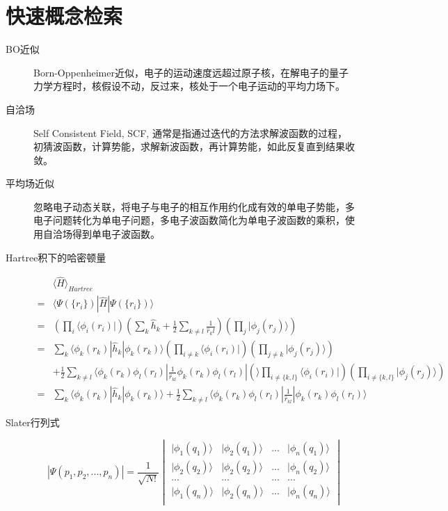 \documentclass[12pt,a4paper,openany,twoside]{book}
\numberwithin{equation}{section}
\newcommand{\bra}[1]{\langle #1 |}
\newcommand{\ket}[1]{| #1 \rangle}
\newcommand{\bracketl}[3]{\langle #1 | #2 | #3 \rangle}
\newcommand{\mean}[1]{\langle #1 \rangle}
\begin{document}
    \section{快速概念检索}
    \begin{description}
      \item[BO近似] Born-Oppenheimer近似，电子的运动速度远超过原子核，在解电子的量子力学方程时，核假设不动，反过来，核处于一个电子运动的平均力场下。
       
      \item[自洽场] Self Consistent Field, SCF, 通常是指通过迭代的方法求解波函数的过程，初猜波函数，计算势能，求解新波函数，再计算势能，如此反复直到结果收敛。
      
      \item[平均场近似] 忽略电子动态关联，将电子与电子的相互作用约化成有效的单电子势能，多电子问题转化为单电子问题，多电子波函数简化为单电子波函数的乘积，使用自洽场得到单电子波函数。
       
      \item[Hartree积下的哈密顿量] 
      \begin{align*}
        &\mean{\hat{H}}_{Hartree} \\
        =& \bracketl{\Psi(\{r_i\})}{\hat{H}}{\Psi(\{r_i\})}\\
        =&(\prod_i\bra{\phi_i(r_i)})(\sum_k\hat{h}_k+\frac{1}{2}\sum_{k\neq l}\frac{1}{\hat{r}_kl})(\prod_j\ket{\phi_j(r_j)})\\
        =&\sum_k\bracketl{\phi_k(r_k)}{\hat{h}_k}{\phi_k(r_k)}(\prod_{i\neq k}\bra{\phi_i(r_i)})(\prod_{j \neq k}\ket{\phi_j(r_j)})\\
        &+\frac{1}{2}\sum_{k \neq l}\bracketl{\phi_k(r_k)\phi_l(r_l)}{\frac{1}{\hat{r}_{kl}}\phi_k(r_k)\phi_l(r_l)}(\prod_{i \neq \{k,l\}}\bra{\phi_i(r_i)})(\prod_{i \neq \{k,l\}}\ket{\phi_j(r_j)})\\
        =&\sum_k\bracketl{\phi_k(r_k)}{\hat{h}_k}{\phi_k(r_k)}+\frac{1}{2}\sum_{k \neq l}\bracketl{\phi_k(r_k)\phi_l(r_l)}{\frac{1}{\hat{r}_{kl}}}{\phi_k(r_k)\phi_l(r_l)}
      \end{align*} 

      \item[Slater行列式]
      \begin{equation}
        |\Psi(p_1,p_2,...,p_n)|=\frac{1}{\sqrt{N!}}
        \begin{vmatrix}
        \ket{\phi_1(q_1)} & \ket{\phi_2(q_1)} & ... & \ket{\phi_n(q_1)}\\
        \ket{\phi_2(q_2)} & \ket{\phi_2(q_2)} & ... & \ket{\phi_n(q_2)}\\
        ... & ...& ... & ...\\
        \ket{\phi_1(q_n)} & \ket{\phi_2(q_n)} & ... & \ket{\phi_n(q_n)}\\
        \end{vmatrix}
      \end{equation}
  

\end{description}
\end{document}
